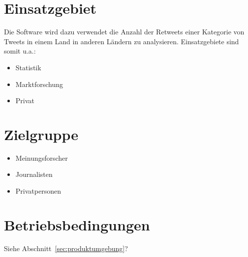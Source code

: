 \section{Einsatzgebiet}
Die Software wird dazu verwendet die Anzahl der Retweets einer Kategorie von Tweets in einem Land in anderen Ländern zu analysieren. Einsatzgebiete sind somit u.a.:
\begin{itemize}[noitemsep,topsep=0.5em]
	\item Statistik
	\item Marktforschung
	\item Privat
\end{itemize}
\section{Zielgruppe}
\begin{itemize}[noitemsep,topsep=0.5em]
	\item Meinungsforscher
	\item Journalisten
	\item Privatpersonen
\end{itemize}
\section{Betriebsbedingungen}
Siehe  Abschnitt~\ref{sec:produktumgebung}?
